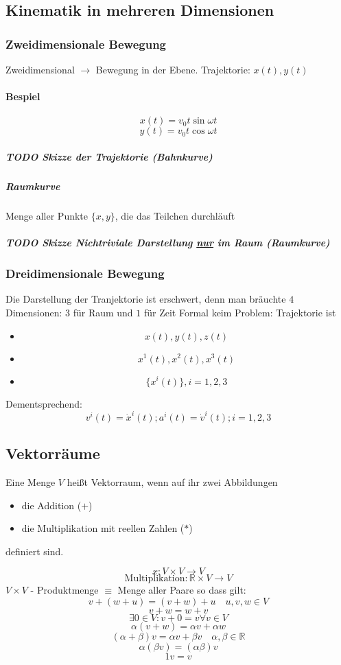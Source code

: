 \documentclass[a4paper]{scrartcl}
\DeclareMathOperator{\Forall}{\forall}
\theoremstyle{definition}
\theoremstyle{plain}
\theoremstyle{remark}
\begin{document}
\subsection{Kinematik in mehreren Dimensionen}
\label{sec-2-3}
\subsubsection{Zweidimensionale Bewegung}
\label{sec-2-3-1}
Zweidimensional $\rightarrow$ Bewegung in der Ebene. Trajektorie: $x(t),y(t)$
\paragraph{Bespiel}
\label{sec-2-3-1-1}
\[x(t) = v_0 t \sin{\omega t}\]
\[y(t) = v_0 t \cos{\omega t}\]
\subparagraph{{\bfseries\sffamily TODO} Skizze der Trajektorie (Bahnkurve)}
\label{sec-2-3-1-1-1}
\subparagraph{Raumkurve}
\label{sec-2-3-1-1-2}
Menge aller Punkte $\{x,y\}$, die das Teilchen durchläuft
\subparagraph{{\bfseries\sffamily TODO} Skizze Nichtriviale Darstellung \underline{nur} im Raum (Raumkurve)}
\label{sec-2-3-1-1-3}
\subsubsection{Dreidimensionale Bewegung}
\label{sec-2-3-2}
Die Darstellung der Tranjektorie ist erschwert, denn man bräuchte $4$ Dimensionen: $3$ für Raum und $1$ für Zeit
Formal keim Problem: Trajektorie ist
\begin{itemize}
\item \[x(t),y(t),z(t)\]
\item \[x^1(t),x^2(t),x^3(t)\]
\item \[\{x^i(t)\},i=1,2,3\]
\end{itemize}

Dementsprechend:
\[v^i(t) = \dot{x}^i(t); a^i(t) = \dot{v}^i(t); i=1,2,3\]
\subsection{Vektorräume}
\label{sec-2-4}
Eine Menge $V$ heißt Vektorraum, wenn auf ihr zwei Abbildungen
\begin{itemize}
\item die Addition ($+$)
\item die Multiplikation mit reellen Zahlen ($*$)
\end{itemize}
definiert sind.

\[x : V\times V \rightarrow V\]
\[\text{Multiplikation}: \mathbb{R}\times V \rightarrow V\]
$V\times V$ - Produktmenge $\equiv$ Menge aller Paare
so dass gilt:
\[v + (w + u) = (v + w) + u\quad u,v,w\in V\tag*{Assoziativität}\]
\[v+w = w+v\tag*{Kommutativität}\]
\[\exists 0 \in V: v + 0 = v \Forall v\in V\tag*{Null}\]
\[\alpha(v+w) = \alpha v + \alpha w \tag*{Distributvität}\]
\[(\alpha + \beta)v = \alpha v + \beta v \quad \alpha,\beta \in \mathbb{R}\tag*{Distributivität}\]
\[\alpha(\beta v) = (\alpha\beta) v\tag*{Assoziativität der Multiplikation}\]
\[1 v = v \tag*{Multiplikation mit Eins}\]
\end{document}
